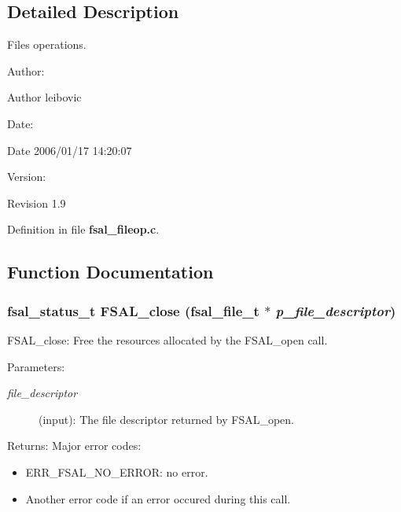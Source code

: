\subsection{Detailed Description}
Files operations. 

\begin{Desc}
\item[Author:]\begin{Desc}
\item[Author]leibovic \end{Desc}
\end{Desc}
\begin{Desc}
\item[Date:]\begin{Desc}
\item[Date]2006/01/17 14:20:07 \end{Desc}
\end{Desc}
\begin{Desc}
\item[Version:]\begin{Desc}
\item[Revision]1.9 \end{Desc}
\end{Desc}


Definition in file {\bf fsal\_\-fileop.c}.

\subsection{Function Documentation}
\subsubsection{\setlength{\rightskip}{0pt plus 5cm}fsal\_\-status\_\-t FSAL\_\-close (fsal\_\-file\_\-t $\ast$ {\em p\_\-file\_\-descriptor})}\label{fsal__fileop_8c_a4}


FSAL\_\-close: Free the resources allocated by the FSAL\_\-open call.

\begin{Desc}
\item[Parameters:]
\begin{description}
\item[{\em file\_\-descriptor}](input): The file descriptor returned by FSAL\_\-open.\end{description}
\end{Desc}
\begin{Desc}
\item[Returns:]Major error codes:\begin{itemize}
\item ERR\_\-FSAL\_\-NO\_\-ERROR: no error.\item Another error code if an error occured during this call. \end{itemize}
\end{Desc}


